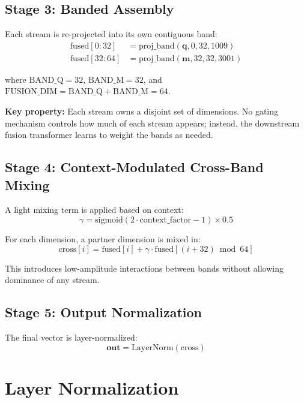 \documentclass[12pt]{article}
\begin{document}
\subsection{Stage 3: Banded Assembly}

Each stream is re-projected into its own contiguous band:
\begin{align}
\text{fused}[0:32]  &= \text{proj\_band}(\mathbf{q},  0,  32, 1009) \\
\text{fused}[32:64] &= \text{proj\_band}(\mathbf{m}, 32, 32, 3001)
\end{align}

where $\text{BAND\_Q} = 32$, $\text{BAND\_M} = 32$, and
$\text{FUSION\_DIM} = \text{BAND\_Q} + \text{BAND\_M} = 64$.

\textbf{Key property:} Each stream owns a disjoint set of dimensions.
No gating mechanism controls how much of each stream appears; instead,
the downstream fusion transformer learns to weight the bands as needed.

\subsection{Stage 4: Context-Modulated Cross-Band Mixing}

A light mixing term is applied based on context:
\begin{equation}
\gamma = \text{sigmoid}(2 \cdot \text{context\_factor} - 1) \times 0.5
\end{equation}

For each dimension, a partner dimension is mixed in:
\begin{equation}
\text{cross}[i] = \text{fused}[i] + \gamma \cdot
\text{fused}[(i + 32) \bmod 64]
\end{equation}

This introduces low-amplitude interactions between bands without
allowing dominance of any stream.

\subsection{Stage 5: Output Normalization}

The final vector is layer-normalized:
\begin{equation}
\mathbf{out} = \text{LayerNorm}(\text{cross})
\end{equation}

\section{Layer Normalization}
\end{document}
